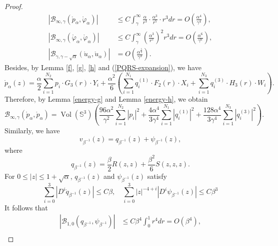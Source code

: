\documentclass[11pt,letterpaper]{amsart}
\DeclareMathOperator{\Vol}{Vol}
\newcommand{\mB}{\mathcal{B}}
\newcommand{\bS}{\mathbb{S}}
\theoremstyle{definition}
\theoremstyle{remark}
\numberwithin{equation}{section}
\begin{document}
\begin{proof}
\begin{equation}
    \begin{split}
        |\mB_{\infty, \gamma}(\mathring{p}_{\alpha},\mathring{\varphi}_{\alpha})|&\leq C\int_{\gamma}^{\infty}\frac{\alpha}{r^3}\cdot \frac{\alpha^3}{r^5}\cdot r^3dr=O\left(\frac{\alpha^4}{\gamma^4}\right),\\
        |\mB_{\infty, \gamma}(\mathring{\varphi}_{\alpha},\mathring{\varphi}_{\alpha})|&\leq C\int_{\gamma}^{\infty}\left(\frac{\alpha^3}{r^5}\right)^2 r^3dr=O\left(\frac{\alpha^6}{\gamma^6}\right),\\
        |\mB_{\gamma, \gamma-\sqrt{\alpha}}(\mathring{u}_{\alpha},\mathring{u}_{\alpha})|&=O\left(\frac{\alpha^{\frac{5}{2}}}{\gamma^3}\right).
    \end{split}
\end{equation}
Besides, by Lemma \ref{f}, \ref{g}, \ref{h} and (\ref{PQRS-expansion}), we have
\begin{equation*}
    \mathring{p}_{\alpha}(z)=\frac{\alpha}{2}\sum_{i=1}^{N_2}p_i\cdot G_3(r)\cdot Y_i+\frac{\alpha^2}{6} \left(\sum_{i=1}^{N_1} q^{(1)}_i\cdot F_2(r)\cdot X_i+\sum_{i=1}^{N_3}q^{(3)}_i \cdot H_3(r)\cdot W_i\right).
\end{equation*}
Therefore, by Lemma \ref{energy-g} and Lemma \ref{energy-h}, we obtain
\begin{equation}
    \mB_{\infty, \gamma}(\mathring{p}_{\alpha},\mathring{p}_{\alpha})=\Vol(\bS^3)\left(\frac{96\alpha^2}{\gamma^2}\sum_{i=1}^{N_2}|p_i|^2+\frac{4\alpha^4}{3\gamma^4}\sum_{i=1}^{N_1}|q^{(1)}_i|^2 +\frac{128\alpha^4}{3\gamma^4} \sum_{i=1}^{N_3}|q^{(3)}_i|^2\right).
\end{equation}
Similarly, we have
\begin{equation}
    v_{\beta^{-1}}(z)=q_{\beta^{-1}}(z)+\psi_{\beta^{-1}}(z) ,
\end{equation}
where
\begin{equation*}
    q_{\beta^{-1}}(z)=\frac{\beta}{2}R(z,z)+\frac{\beta^2}{6}S(z,z,z).
\end{equation*}
For $0\leq |z|\leq 1+\sqrt{\alpha}$, $q_{\beta^{-1}}(z)$ and $\psi_{\beta^{-1}}(z)$ satisfy
\begin{equation}\label{apriori-estimate-v}
\sum_{i=0}^{3} |D^{i}\mathring{q}_{\beta^{-1}}(z)|\leq C\beta,\quad \sum_{i=0}^{3} |z|^{-4+i}|D^{i}\psi_{\beta^{-1}}(z)|\leq C\beta^3 
\end{equation}
It follows that
\begin{equation}
    \begin{split}
        |\mB_{1, 0}(q_{\beta^{-1}},\psi_{\beta^{-1}})|&\leq C\beta^4\int_{0}^{1} r^4dr=O(\beta^4),\\

\end{split}
\end{equation}
\end{proof}
\end{document}
